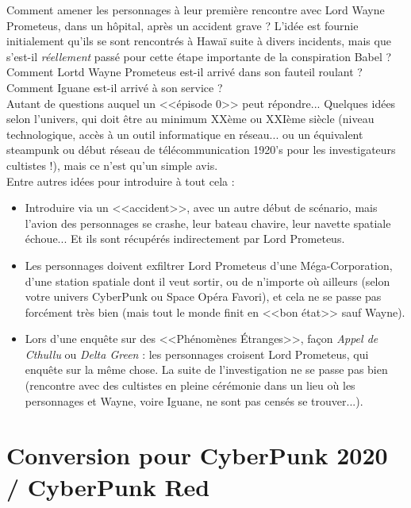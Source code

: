 \documentclass[11pt,twoside,a4paper]{book}
\begin{document}
Comment amener les personnages {\`a} leur premi{\`e}re rencontre avec Lord Wayne Prometeus, dans un h{\^o}pital, apr{\`e}s un accident grave ? L'id{\'e}e est fournie initialement qu'ils se sont rencontr{\'e}s {\`a} Hawa{\"i} suite {\`a} divers incidents, mais que s'est-il \emph{r{\'e}ellement} pass{\'e} pour cette {\'e}tape importante de la conspiration Babel ? Comment Lortd Wayne Prometeus est-il arriv{\'e} dans son fauteil roulant ? Comment Iguane est-il arriv{\'e} {\`a} son service ? ~\\

Autant de questions auquel un <<{\'e}pisode 0>> peut r{\'e}pondre... Quelques id{\'e}es selon l'univers, qui doit {\^e}tre au minimum XX{\`e}me ou XXI{\`e}me si{\`e}cle (niveau technologique, acc{\`e}s {\`a} un outil informatique en r{\'e}seau... ou un {\'e}quivalent steampunk ou d{\'e}but r{\'e}seau de t{\'e}l{\'e}communication 1920's pour les investigateurs cultistes !), mais ce n'est qu'un simple avis. ~\\

Entre autres id{\'e}es pour introduire {\`a} tout cela : 
\begin{itemize}
	\item Introduire via un <<accident>>, avec un autre d{\'e}but de sc{\'e}nario, mais l'avion des personnages se crashe, leur bateau chavire, leur navette spatiale {\'e}choue... Et ils sont r{\'e}cup{\'e}r{\'e}s indirectement par Lord Prometeus. 
	\item Les personnages doivent exfiltrer Lord Prometeus d'une M{\'e}ga-Corporation, d'une station spatiale dont il veut sortir, ou de n'importe o{\`u} ailleurs (selon votre univers CyberPunk ou Space Op{\'e}ra Favori), et cela ne se passe pas forc{\'e}ment tr{\`e}s bien (mais tout le monde finit en <<bon {\'e}tat>> sauf Wayne). 
	\item Lors d'une enqu{\^e}te sur des <<Ph{\'e}nom{\`e}nes {\'E}tranges>>, fa\c{c}on \emph{Appel de Cthullu} ou \emph{Delta Green} : les personnages croisent Lord Prometeus, qui enqu{\^e}te sur la m{\^e}me chose. La suite de l'investigation ne se passe pas bien (rencontre avec des cultistes en pleine c{\'e}r{\'e}monie dans un lieu o{\`u} les personnages et Wayne, voire Iguane, ne sont pas cens{\'e}s se trouver...). 
\end{itemize}

\dotfill

\clearpage

\section*{Conversion pour CyberPunk 2020 / CyberPunk Red}
\end{document}
